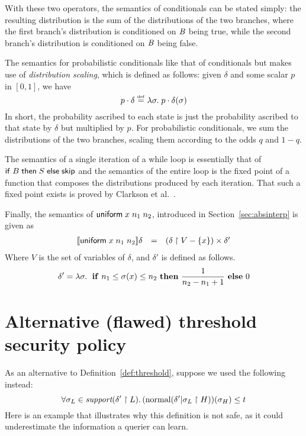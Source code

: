 With these two operators, the semantics of conditionals can be stated
simply: the resulting distribution is the sum of the distributions of
the two branches, where the first branch's distribution is conditioned
on $\mathit{B}$ being true, while the second branch's distribution is
conditioned on $\mathit{B}$ being false.

The semantics for probabilistic conditionals like that of conditionals
but makes use of \emph{distribution scaling}, which is defined as
follows: given $\delta$ and some scalar $p$ in $[0,1]$, we have
$$ p \cdot \delta \stackrel{\smash{\scriptscriptstyle \mathrm{def}}}= \lambda \sigma . \; p \cdot \delta(\sigma) $$
In short, the probability ascribed to each state is just the
probability ascribed to that state by $\delta$ but multiplied by $p$.
For probabilistic conditionals, we sum the distributions of the two
branches, scaling them according to the odds $q$ and $1 - q$.

The semantics of a single iteration of a while loop is
essentially that of $\mathsf{if}\;{B}\;\mathsf{then}\;{S}\;\mathsf{else}\;{\mathsf{skip}}$ and the semantics of the
entire loop is the fixed point of a function that composes the
distributions produced by each iteration.  That such a fixed point exists
is proved by Clarkson et al.~\cite{clarkson09quantifying}.

Finally, the semantics of $\mathsf{uniform}\;{x}\;{n_1}\;n_2$, introduced in
Section~\ref{sec:absinterp} is given as
$$
\begin{array}{rcl}
[\![{\mathsf{uniform}\;{x}\;{n_1}\;n_2}]\!]{\delta} & = &
\left( \delta \upharpoonright V - \left\{ x \right\} \right) \times \delta'
\end{array}
$$
Where $ V $ is the set of variables of $ \delta $, and $ \delta' $ is
defined as follows.
$$ \delta ' = \lambda \sigma . \; \text{ \textbf{if} } n_1 \leq \sigma(x) \leq n_2 \text{ \textbf{then} }
\frac{1}{n_2-n_1+1} \text{ \textbf{else} } 0 $$

\vspace*{.1in}
\section{Alternative (flawed) threshold security policy}
\label{appendix:flawed}

As an alternative to Definition~\ref{def:threshold}, suppose we used the
following instead:
$$\forall \sigma_L \in
\textit{support}(\delta' \upharpoonright L).\,
(\text{normal}(\delta' | \sigma_L \upharpoonright H))(\sigma_H) \leq t$$
Here is an example that illustrates why this definition is not safe, as it
could underestimate the information a querier can learn.

